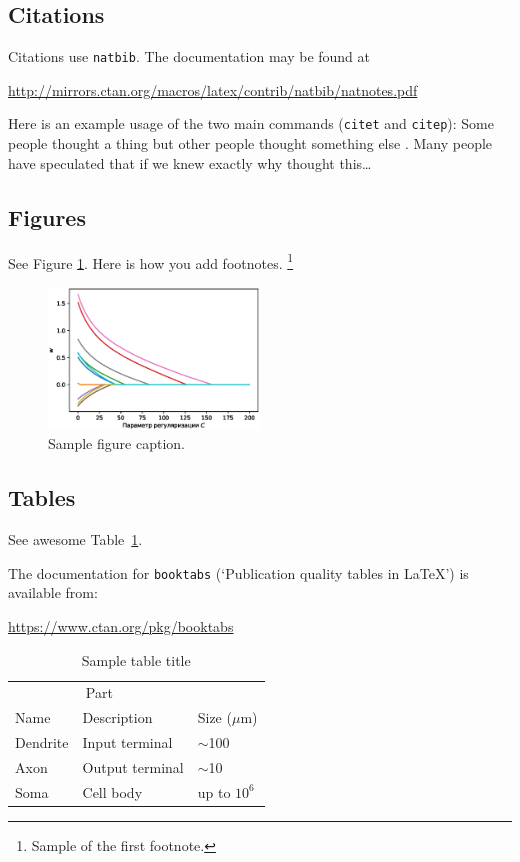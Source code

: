 \documentclass{article}
\begin{document}
\subsection{Citations}
Citations use \verb+natbib+. The documentation may be found at
\begin{center}
	\url{http://mirrors.ctan.org/macros/latex/contrib/natbib/natnotes.pdf}
\end{center}

Here is an example usage of the two main commands (\verb+citet+ and \verb+citep+): Some people thought a thing \citep{kour2014real, hadash2018estimate} but other people thought something else \citep{kour2014fast}. Many people have speculated that if we knew exactly why \citet{kour2014fast} thought this\dots

\subsection{Figures}
\lipsum[10]
See Figure \ref{fig:fig1}. Here is how you add footnotes. \footnote{Sample of the first footnote.}
\lipsum[11]

\begin{figure}
	\centering
	\includegraphics[width=0.5\textwidth]{../figures/log_reg_cs_exp.eps}
	\caption{Sample figure caption.}
	\label{fig:fig1}
\end{figure}

\subsection{Tables}
See awesome Table~\ref{tab:table}.

The documentation for \verb+booktabs+ (`Publication quality tables in LaTeX') is available from:
\begin{center}
	\url{https://www.ctan.org/pkg/booktabs}
\end{center}


\begin{table}
	\caption{Sample table title}
	\centering
	\begin{tabular}{lll}
		\toprule
		\multicolumn{2}{c}{Part}                   \\
		\cmidrule(r){1-2}
		Name     & Description     & Size ($\mu$m) \\
		\midrule
		Dendrite & Input terminal  & $\sim$100     \\
		Axon     & Output terminal & $\sim$10      \\
		Soma     & Cell body       & up to $10^6$  \\
		\bottomrule
	\end{tabular}
	\label{tab:table}
\end{table}
\end{document}
